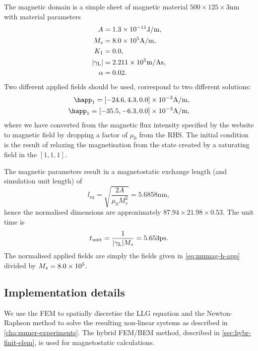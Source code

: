 The magnetic domain is a simple sheet of magnetic material $500 \times 125 \times 3$nm with material parameters
\begin{equation}
  \begin{aligned}
    A &= 1.3\times 10^{-11} \text{J/m}, \\
    M_s &= 8.0\times 10^{5} \text{A/m}, \\
    K_1 &= 0.0, \\
    {\left|{\gamma_{\mathrm{\tiny{L}}}} \right|} &= 2.211 \times 10^{5} \text{m/As}, \\
    \alpha &= 0.02.
  \end{aligned}
\end{equation}
Two different applied fields should be used, correspond to two different solutions:
\begin{equation}
  \begin{aligned}
    \happ_1 = [-24.6, 4.3, 0.0] \E{-3}\text{A/m}, \\
    \happ_1 = [-35.5, -6.3, 0.0] \E{-3}\text{A/m}, \\
  \end{aligned}
  \label{eq:mumag-h-app}
\end{equation}
where we have converted from the magnetic flux intensity specified by the \mumag website to magnetic field by dropping a factor of $\mu_0$ from the RHS.
The initial condition is the result of relaxing the magnetisation from the state created by a saturating field in the $[1,1,1]$.

The magnetic parameters result in a magnetostatic exchange length (and simulation unit length) of
\begin{equation}
  l_{\text{ex}} = \sqrt{\frac{2A}{\mu_0 M_s^2}} = 5.6858\text{nm},
\end{equation}
hence the normalised dimensions are approximately $87.94 \times 21.98 \times 0.53$.
The unit time is
\begin{equation}
  t_{\text{unit}} = \frac{1}{{\left|{\gamma_{\mathrm{\tiny{L}}}} \right|} M_s} = 5.653\text{ps}.
\end{equation}
The normalised applied fields are simply the fields given in \cref{eq:mumag-h-app} divided by $M_s = 8.0\times 10^{5}$.

\subsection{Implementation details}

We use the FEM to spatially discretise the LLG equation and the Newton-Raphson method to solve the resulting non-linear systems as described in \cref{cha:numer-experiments}.
The hybrid FEM/BEM method, described in \cref{sec:hybr-finit-elem}, is used for magnetostatic calculations.

